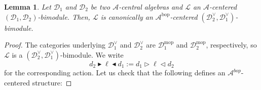 \documentclass[a4paper]{article}
\numberwithin{equation}{section}
\newtheorem{lemma}[counter]{Lemma}
\newcommand{\1}{{\mathrm{1}\mkern-4mu{\mathchoice{}{}{\mskip-0.5mu}{\mskip-1mu}}\mathrm{l}}}
\newcommand{\A}{\mathcal{A}}
\newcommand{\D}{\mathcal{D}}
\renewcommand{\L}{\mathcal{L}}
\newcommand{\bop}{\text{bop}}
\newcommand{\mop}{\text{mop}}
\begin{document}
\begin{lemma}\label{lemma:dual-line}
  Let $\D_1$ and $\D_2$ be two $\A$-central algebras and $\L$ an $\A$-centered $(\D_1,\D_2)$-bimodule. Then, $\L$ is canonically an $\A^{\bop}$-centered $(\D_2^\vee,\D_1^\vee)$-bimodule.
\end{lemma}
\begin{proof}
  The categories underlying $\D_1^\vee$ and $\D_2^\vee$ are $\D_1^{\mop}$ and $\D_2^{\mop}$, respectively, so $\L$ is a $(\D_2^\vee,\D_1^\vee)$-bimodule. We write
  \begin{equation}
  d_2\blacktriangleright\ell\blacktriangleleft d_1 := d_1\triangleright\ell\triangleleft d_2
  \end{equation}
  for the corresponding action.
  Let us check that the following defines an $\A^{bop}$-centered structure:
  

\end{proof}
\end{document}

